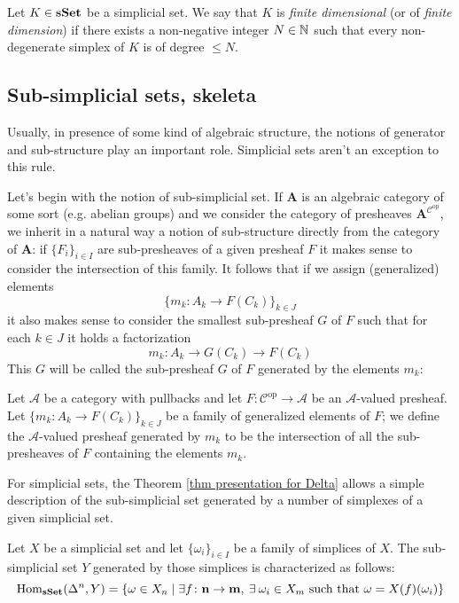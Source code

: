 \begin{refsection}
\begin{defin} \label{def simplicial set of finite dimension}
Let $K \in \mathbf{sSet}$ be a simplicial set. We say that $K$ is \emph{finite dimensional} (or of \emph{finite dimension}) if there exists a non-negative integer $N \in \mathbb{N}$ such that every non-degenerate simplex of $K$ is of degree $\le N$.
\end{defin}

\subsection{Sub-simplicial sets, skeleta}

Usually, in presence of some kind of algebraic structure, the notions of generator and sub-structure play an important role. Simplicial sets aren't an exception to this rule.

Let's begin with the notion of sub-simplicial set. If $\mathbf A$ is an algebraic category of some sort (e.g. abelian groups) and we consider the category of presheaves $\mathbf A^{\mathcal C^\mathrm{op}}$, we inherit in a natural way a notion of sub-structure directly from the category of $\mathbf A$: if $\{F_i\}_{i \in I}$ are sub-presheaves of a given presheaf $F$ it makes sense to consider the intersection of this family. It follows that if we assign (generalized) elements
\[
\{m_k \colon A_k \to F(C_k)\}_{k \in J}
\]
it also makes sense to consider the smallest sub-presheaf $G$ of $F$ such that for each $k \in J$ it holds a factorization
\[
m_k \colon A_k \to G(C_k) \to F(C_k)
\]
This $G$ will be called the sub-presheaf $G$ of $F$ generated by the elements $m_k$:

\begin{defin}
Let $\mathcal A$ be a category with pullbacks and let $F \colon \mathcal C^{\mathrm{op}} \to \mathcal A$ be an $\mathcal A$-valued presheaf. Let $\{m_k \colon A_k \to F(C_k)\}_{k \in J}$ be a family of generalized elements of $F$; we define the $\mathcal A$-valued presheaf generated by $m_k$ to be the intersection of all the sub-presheaves of $F$ containing the elements $m_k$.
\end{defin}

For simplicial sets, the Theorem \ref{thm presentation for Delta} allows a simple description of the sub-simplicial set generated by a number of simplexes of a given simplicial set.

\begin{prop} \label{prop sub simplicial set}
Let $X$ be a simplicial set and let $\{\omega_i\}_{i \in I}$ be a family of simplices of $X$. The sub-simplicial set $Y$ generated by those simplices is characterized as follows:
\[
\mathrm{Hom}_{\mathbf{sSet}}(\Delta^n,Y) = \{\omega \in X_n \mid \exists f \colon \mathbf n \to \mathbf m, \: \exists \: \omega_i \in X_m \text{ such that } \omega = X(f)(\omega_i) \}
\]
\end{prop}


\end{refsection}
